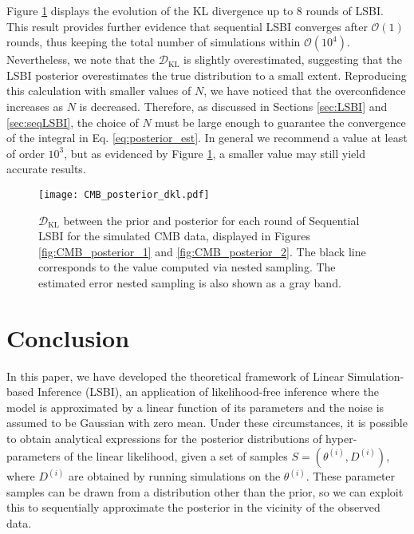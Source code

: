 \documentclass[%
 reprint,
 amsmath,amssymb,
 aps,
]{revtex4-2}
\begin{document}
Figure \ref{fig:CMB_posterior_dkl} displays the evolution of the KL divergence up to 8 rounds of LSBI. This result provides further evidence that sequential LSBI converges after $\mathcal{O}(1)$ rounds, thus keeping the total number of simulations within $\mathcal{O}(10^4)$. Nevertheless, we note that the $ \mathcal{D}_\mathrm{KL}$ is slightly overestimated, suggesting that the LSBI posterior overestimates the true distribution to a small extent. Reproducing this calculation with smaller values of $N$, we have noticed that the overconfidence increases as $N$ is decreased. Therefore, as discussed in Sections \ref{sec:LSBI} and  \ref{sec:seqLSBI}, the choice of $N$ must be large enough to guarantee the convergence of the integral in Eq. \ref{eq:posterior_est}. In general we recommend a value at least of order $10^3$, but as evidenced by Figure \ref{fig:CMB_posterior_dkl}, a smaller value may still yield accurate results.

\begin{figure}[t]
\hspace{-4mm}
\texttt{[image: CMB\_posterior\_dkl.pdf]}
\caption{\label{fig:CMB_posterior_dkl}
$\mathcal{D}_\mathrm{KL}$ between the prior and posterior for each round of Sequential LSBI for the simulated CMB data, displayed in Figures \ref{fig:CMB_posterior_1} and \ref{fig:CMB_posterior_2}. The black line corresponds to the value computed via nested sampling. The estimated error nested sampling is also shown as a gray band.
}
\end{figure}
 
\section{Conclusion}


In this paper, we have developed the theoretical framework of Linear Simulation-based Inference (LSBI), an application of likelihood-free inference where the model is approximated by a linear function of its parameters and the noise is assumed to be Gaussian with zero mean. Under these circumstances, it is possible to obtain analytical expressions for the posterior distributions of hyper-parameters of the linear likelihood, given a set of samples $S = (\theta^{(i)},D^{(i)})$, where $D^{(i)}$ are obtained by running simulations on the $\theta^{(i)}$. These parameter samples can be drawn from a distribution other than the prior, so we can exploit this to sequentially approximate the posterior in the vicinity of the observed data. 
\end{document}
